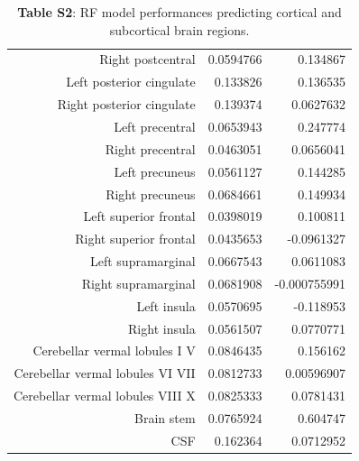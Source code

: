 \documentclass{article}
\begin{document}
\begin{table}[h]
\begin{centering}
\begin{tabular}{|r|r|r|}
      Right postcentral & 0.0594766 & 0.134867 \\
      Left posterior cingulate & 0.133826 & 0.136535 \\
      Right posterior cingulate & 0.139374 & 0.0627632 \\
      Left precentral & 0.0653943 & 0.247774 \\
      Right precentral & 0.0463051 & 0.0656041 \\
      Left precuneus & 0.0561127 & 0.144285 \\
      Right precuneus & 0.0684661 & 0.149934 \\
      Left superior frontal & 0.0398019 & 0.100811 \\
      Right superior frontal & 0.0435653 & -0.0961327 \\
      Left supramarginal & 0.0667543 & 0.0611083 \\
      Right supramarginal & 0.0681908 & -0.000755991 \\
      Left insula & 0.0570695 & -0.118953 \\
      Right insula & 0.0561507 & 0.0770771 \\
      Cerebellar vermal lobules I V & 0.0846435 & 0.156162 \\
      Cerebellar vermal lobules VI VII & 0.0812733 & 0.00596907 \\
      Cerebellar vermal lobules VIII X & 0.0825333 & 0.0781431 \\
      Brain stem & 0.0765924 & 0.604747 \\
      CSF & 0.162364 & 0.0712952 \\\hline\hline
    \end{tabular}
    \caption*{
        \textbf{Table S2}: RF model performances predicting cortical and
        subcortical brain regions.
    }
    \end{centering}
  \end{table}
\end{document}
